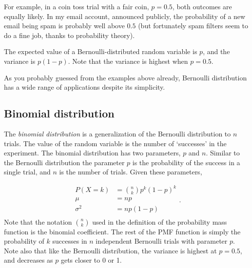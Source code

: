 For example, in a coin toss trial with a fair coin,
$p=0.5$, both outcomes are equally likely.
In my email account, announced publicly,
the probability of a new email being spam is probably well above $0.5$
(but fortunately spam filters seem to do a fine job,
thanks to probability theory).

The expected value of a Bernoulli-distributed random variable is $p$,
and the variance is $p(1-p)$.
Note that the variance is highest when $p = 0.5$.

As you probably guessed from the examples above already,
Bernoulli distribution has a wide range of applications
despite its simplicity.

\subsection{Binomial distribution}

The \emph{binomial distribution} is a generalization
of the Bernoulli distribution to $n$ trials.
The value of the random variable is
the number of `successes' in the experiment.
The binomial distribution has two parameters, $p$ and $n$.
Similar to the Bernoulli distribution the parameter $p$ 
is the probability of the success in a single trial,
and $n$ is the number of trials.
Given these parameters,

\[
  \begin{aligned}
    P(X = k) &= \binom{n}{k} p^{k} (1 - p)^k \\
    \mu &= np \\
    \sigma^{2} &= np (1-p)\\
  \end{aligned}.
\]
Note that the notation $\binom{n}{k}$
used in the definition of the probability mass function is
the binomial coefficient.
The rest of the PMF function is simply
the probability of $k$ successes in $n$ independent Bernoulli trials
with parameter $p$.
Note also that like the Bernoulli distribution,
the variance is highest at $p = 0.5$,
and decreases as $p$ gets closer to \num{0} or \num{1}.

